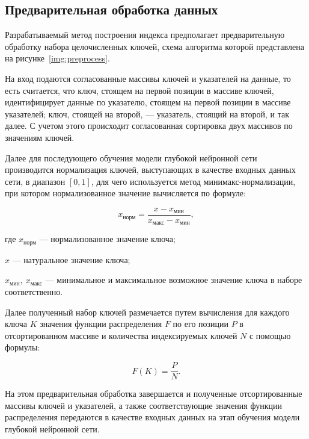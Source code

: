 \subsection{Предварительная обработка данных}

Разрабатываемый метод построения индекса предполагает предварительную обработку
набора целочисленных ключей, схема алгоритма которой представлена на
рисунке~\ref{img:preprocess}.


На вход подаются согласованные массивы ключей и указателей на данные, то есть
считается, что ключ, стоящем на первой позиции в массиве ключей, идентифицирует
данные по указателю, стоящем на первой позиции в массиве указателей; ключ,
стоящей на второй, --- указатель, стоящий на второй, и так далее. С учетом этого
происходит согласованная сортировка двух массивов по значениям ключей.

Далее для последующего обучения модели глубокой нейронной сети производится
нормализация ключей, выступающих в качестве входных данных сети, в диапазон $[0,
1]$, для чего используется метод минимакс-нормализации, при котором
нормализованное значение вычисляется по формуле:

\begin{equation}
    x_{\text{норм}}= \frac{x - x_{\text{мин}}}{x_{\text{макс}} - x_{\text{мин}}},
\end{equation}

где $x_{\text{норм}}$ --- нормализованное значение ключа;

$x$ --- натуральное значение ключа;

$x_{\text{мин}},~x_{\text{макс}}$ --- минимальное и максимальное возможное
значение ключа в наборе соответственно.

Далее полученный набор ключей размечается путем вычисления для каждого ключа $K$
значения функции распределения $F$ по его позиции $P$ в отсортированном массиве
и количества индексируемых ключей $N$ с помощью формулы:

\begin{equation}
    F(K) = \frac{P}{N}.
\end{equation}

На этом предварительная обработка завершается и полученные отсортированные
массивы ключей и указателей, а также соответствующие значения функции
распределения передаются в качестве входных данных на этап обучения модели
глубокой нейронной сети.

